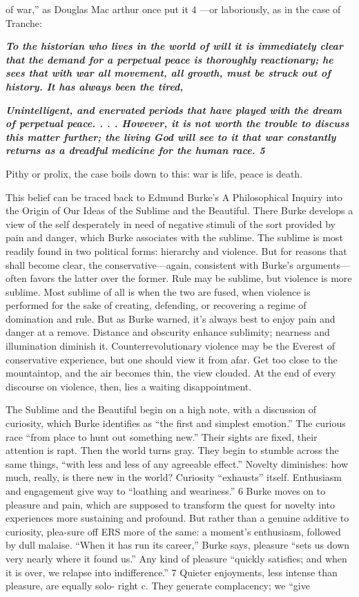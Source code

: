 of war,” as Douglas Mac arthur once put it {\color{blue} 4 } —or laboriously, as in the case of Tranche:{\par} {\textbf{\textit{To the historian who lives in the world of will it is immediately clear that the demand for a perpetual peace is thoroughly reactionary; he sees that with war all movement, all growth, must be struck out of history. It has always been the tired,} } }{\par} {\par} {\textbf{\textit{Unintelligent, and enervated periods that have played with the dream of perpetual peace. . . . However, it is not worth the trouble to discuss this matter further; the living God will see to it that war constantly returns as a dreadful medicine for the human race. {\color{blue} 5 } } } }{\par} Pithy or prolix, the case boils down to this: war is life, peace is death.{\par} This belief can be traced back to Edmund Burke’s A Philosophical Inquiry into the Origin of Our Ideas of the Sublime and the Beautiful. There Burke develops a view of the self desperately in need of negative stimuli of the sort provided by pain and danger, which Burke associates with the sublime. The sublime is most readily found in two political forms: hierarchy and violence. But for reasons that shall become clear, the conservative—again, consistent with Burke’s arguments—often favors the latter over the former. Rule may be sublime, but violence is more sublime. Most sublime of all is when the two are fused, when violence is performed for the sake of creating, defending, or recovering a regime of domination and rule. But as Burke warned, it’s always best to enjoy pain and danger at a remove. Distance and obscurity enhance sublimity; nearness and illumination diminish it. Counterrevolutionary violence may be the Everest of conservative experience, but one should view it from afar. Get too close to the mountaintop, and the air becomes thin, the view clouded. At the end of every discourse on violence, then, lies a waiting disappointment.{\par} The Sublime and the Beautiful begin on a high note, with a discussion of curiosity, which Burke identifies as “the first and simplest emotion.” The curious race “from place to hunt out something new.” Their sights are fixed, their attention is rapt. Then the world turns gray. They begin to stumble across the same things, “with less and less of any agreeable effect.” Novelty diminishes: how much, really, is there new in the world? Curiosity “exhausts” itself. Enthusiasm and engagement give way to “loathing and weariness.” {\color{blue} 6 } Burke moves on to pleasure and pain, which are supposed to transform the quest for novelty into experiences more sustaining and profound. But rather than a genuine additive to curiosity, plea-sure off ERS more of the same: a moment’s enthusiasm, followed by dull malaise. “When it has run its career,” Burke says, pleasure “sets us down very nearly where it found us.” Any kind of pleasure “quickly satisfies; and when it is over, we relapse into indifference.” {\color{blue} 7 } Quieter enjoyments, less intense than pleasure, are equally solo- right c. They generate complacency; we “give 